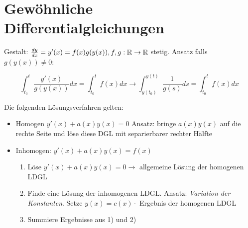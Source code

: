 \begin{satz}
	
\end{satz}

\pagebreak

\section{Gewöhnliche Differentialgleichungen}
\begin{definition}
	
	Gestalt: $\frac{d y}{d x} = y'(x) = f(x)g(y(x)), f,g : \mathbb{R} \rightarrow \mathbb{R}$ stetig. Ansatz falls $g(y(x)) \neq 0$:
	
	\begin{equation*}
		\int_{t_0}^{t} \frac{y'(x)}{g(y(x))} dx = \int_{t_0}^{t} f(x) dx \rightarrow \int_{y(t_0)}^{y(t)} \frac{1}{g(s)} ds = \int_{t_0}^{t} f(x) dx
	\end{equation*}
\end{definition}

\begin{definition}
	Die folgenden Lösungsverfahren gelten:
	\begin{itemize}
		\item Homogen $y'(x) + a(x)y(x) = 0$ Ansatz: bringe $a(x)y(x)$ auf die rechte Seite und löse diese DGL mit separierbarer rechter Hälfte
		\item Inhomogen: $y'(x) + a(x)y(x) = f(x)$ 
			\begin{enumerate} [noitemsep]
				\item Löse $y'(x) +a(x)y(x) = 0 \rightarrow $ allgemeine Lösung der homogenen LDGL
				\item Finde eine Lösung der inhomogenen LDGL. Ansatz: \emph{Variation der Konstanten}. Setze $y(x) = c(x) \cdot$ Ergebnis der homogenen LDGL
				\item Summiere Ergebnisse aus 1) und 2)
			\end{enumerate}
	\end{itemize}
\end{definition}

